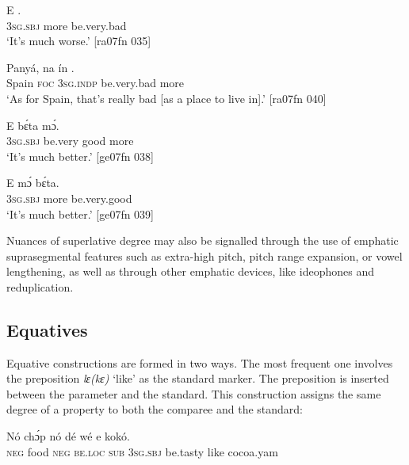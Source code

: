 \ea%
    \label{ex:key:501}
    \gll E        .\\
\textsc{3sg.sbj}  more  be.very.bad\\

\glt ‘It’s much worse.’ [ra07fn 035]
\z


\ea%
    \label{ex:key:502}
    \gll Panyá,  na  ín          .\\
Spain  \textsc{foc}  \textsc{3sg.indp}  be.very.bad  more\\

\glt ‘As for Spain, that’s really bad [as a place to live in].’ [ra07fn 040]
\z


\ea%
    \label{ex:key:503}
    \gll E    bɛ́ta      mɔ́.\\
\textsc{3sg.sbj}  be.very good  more\\

\glt ‘It’s much better.’ [ge07fn 038]
\z


\ea%
    \label{ex:key:504}
    \gll E    mɔ́    bɛ́ta.\\
\textsc{3sg.sbj}  more  be.very.good\\

\glt ‘It’s much better.’ [ge07fn 039]
\z

Nuances of superlative degree may also be signalled through the use of emphatic suprasegmental features such as extra-high pitch, pitch range expansion, or vowel lengthening, as well as through other emphatic devices, like ideophones and reduplication.

\subsection{Equatives}\label{sec:6.9.3}

Equative constructions are formed in two ways. The most frequent one involves the preposition \textit{lɛ(kɛ)} ‘like’ as the standard marker. The preposition is inserted between the parameter and the standard. This construction assigns the same degree of a property to both the comparee and the standard: 


\ea%
    \label{ex:key:505}
    \gll Nó  chɔ́p  nó  dé    wé  e         kokó.\\
\textsc{neg}  food    \textsc{neg}  \textsc{be.loc}  \textsc{sub}  \textsc{3sg.sbj}  be.tasty  like  cocoa.yam\\

